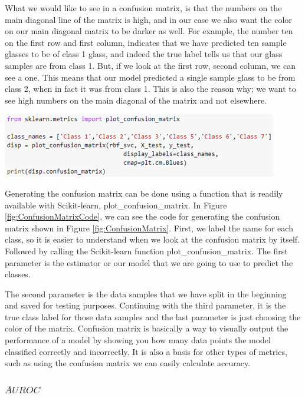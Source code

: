 \documentclass[a4paper,12pt]{report}
\begin{document}
What we would like to see in a confusion matrix, is that the numbers on the main diagonal line of the matrix is high, and in our case we also want the color on our main diagonal matrix to be darker as well. For example, the number ten on the first row and first column, indicates that we have predicted ten sample glasses to be of class 1 glass, and indeed the true label tells us that our glass samples are from class 1. But, if we look at the first row, second column, we can see a one. This means that our model predicted a single sample glass to be from class 2, when in fact it was from class 1. This is also the reason why; we want to see high numbers on the main diagonal of the matrix and not elsewhere.

\begin{center}
    \captionsetup{type=figure}
    \includegraphics[width=.9\linewidth]{media/ConfusionMatrixCode.png}
    \label{fig:ConfusionMatrixCode}
\end{center}

Generating the confusion matrix can be done using a function that is readily available with Scikit-learn, plot\_confusion\_matrix. In Figure \ref{fig:ConfusionMatrixCode}, we can see the code for generating the confusion matrix shown in Figure \ref{fig:ConfusionMatrix}. First, we label the name for each class, so it is easier to understand when we look at the confusion matrix by itself. Followed by calling the Scikit-learn function plot\_confusion\_matrix. The first parameter is the estimator or our model that we are going to use to predict the classes.

The second parameter is the data samples that we have split in the beginning and saved for testing purposes. Continuing with the third parameter, it is the true class label for those data samples and the last parameter is just choosing the color of the matrix. Confusion matrix is basically a way to visually output the performance of a model by showing you how many data points the model classified correctly and incorrectly. It is also a basis for other types of metrics, such as using the confusion matrix we can easily calculate accuracy.

\subsubsection{$AUROC$}
\end{document}
